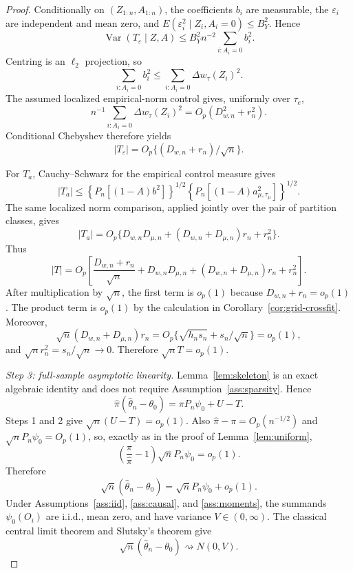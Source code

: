 \begin{proof}
Conditionally on $(Z_{1:n},A_{1:n})$, the coefficients $b_i$ are measurable,
the $\varepsilon_i$ are independent and mean zero, and
$E(\varepsilon_i^2\mid Z_i,A_i=0)\le B_Y^2$.  Hence
\[
 \operatorname{Var}(T_\varepsilon\mid Z,A)
 \le B_Y^2n^{-2}\sum_{i:A_i=0}b_i^2.
\]
Centring is an $\ell_2$ projection, so
\[
 \sum_{i:A_i=0}b_i^2
 \le\sum_{i:A_i=0}\Delta w_\tau(Z_i)^2.
\]
The assumed localized empirical-norm control gives, uniformly over
$\tau_e$,
\[
 n^{-1}\sum_{i:A_i=0}\Delta w_\tau(Z_i)^2
 =O_p(D_{w,n}^2+r_n^2).
\]
Conditional Chebyshev therefore yields
\[
 |T_\varepsilon|
 =O_p\{(D_{w,n}+r_n)/\sqrt n\}.
\]

For $T_a$, Cauchy--Schwarz for the empirical control measure gives
\[
 |T_a|
 \le
 \left\{P_n[(1-A)b^2]\right\}^{1/2}
 \left\{P_n[(1-A)a_{\mu,\tau_\mu}^2]\right\}^{1/2}.
\]
The same localized norm comparison, applied jointly over the pair of
partition classes, gives
\[
 |T_a|
 =O_p\{D_{w,n}D_{\mu,n}
       +(D_{w,n}+D_{\mu,n})r_n+r_n^2\}.
\]
Thus
\[
 |T|
 =O_p\!\left[
 \frac{D_{w,n}+r_n}{\sqrt n}
 +D_{w,n}D_{\mu,n}
 +(D_{w,n}+D_{\mu,n})r_n+r_n^2
 \right].
\]
After multiplication by $\sqrt n$, the first term is $o_p(1)$ because
$D_{w,n}+r_n=o_p(1)$.  The product term is $o_p(1)$ by the calculation in
Corollary~\ref{cor:grid-crossfit}.  Moreover,
\[
 \sqrt n(D_{w,n}+D_{\mu,n})r_n
 =O_p\{\sqrt{h_ns_n}+s_n/\sqrt n\}=o_p(1),
\]
and $\sqrt n r_n^2=s_n/\sqrt n\to0$.  Therefore
$\sqrt nT=o_p(1)$.

\emph{Step 3: full-sample asymptotic linearity.}
Lemma~\ref{lem:skeleton} is an exact algebraic identity and does not require
Assumption~\ref{ass:sparsity}.  Hence
\[
 \widehat\pi(\widehat\theta_n-\theta_0)
 =\pi P_n\psi_0+U-T.
\]
Steps 1 and 2 give $\sqrt n(U-T)=o_p(1)$.  Also
$\widehat\pi-\pi=O_p(n^{-1/2})$ and
$\sqrt nP_n\psi_0=O_p(1)$, so, exactly as in the proof of
Lemma~\ref{lem:uniform},
\[
 \left(\frac{\pi}{\widehat\pi}-1\right)\sqrt nP_n\psi_0=o_p(1).
\]
Therefore
\[
 \sqrt n(\widehat\theta_n-\theta_0)
 =\sqrt nP_n\psi_0+o_p(1).
\]
Under Assumptions~\ref{ass:iid}, \ref{ass:causal}, and
\ref{ass:moments}, the summands $\psi_0(O_i)$ are i.i.d., mean zero, and have
variance $V\in(0,\infty)$.  The classical central limit theorem and Slutsky's
theorem give
\[
 \sqrt n(\widehat\theta_n-\theta_0)\rightsquigarrow N(0,V).
\]


\end{proof}
